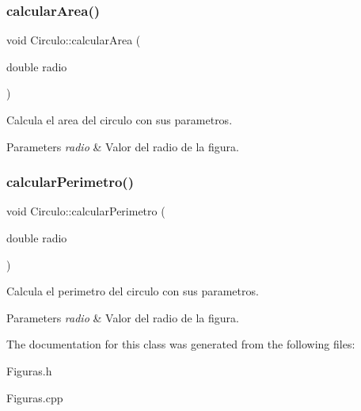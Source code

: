\subsubsection{\texorpdfstring{calcular\+Area()}{calcularArea()}}
{\ttfamily void Circulo\+::calcular\+Area (\begin{DoxyParamCaption}\item[{double}]{radio }\end{DoxyParamCaption})\hspace{0.3cm}{\ttfamily [virtual]}}



Calcula el area del circulo con sus parametros. 


\begin{DoxyParams}{Parameters}
{\em radio} & Valor del radio de la figura. \\
\hline
\end{DoxyParams}
\hypertarget{class_circulo_a4b621679f004d4a093cb18b676079a01}{}\label{class_circulo_a4b621679f004d4a093cb18b676079a01} 
\subsubsection{\texorpdfstring{calcular\+Perimetro()}{calcularPerimetro()}}
{\ttfamily void Circulo\+::calcular\+Perimetro (\begin{DoxyParamCaption}\item[{double}]{radio }\end{DoxyParamCaption})\hspace{0.3cm}{\ttfamily [virtual]}}



Calcula el perimetro del circulo con sus parametros. 


\begin{DoxyParams}{Parameters}
{\em radio} & Valor del radio de la figura. \\
\hline
\end{DoxyParams}


The documentation for this class was generated from the following files\+:\begin{DoxyCompactItemize}
\item 
Figuras.\+h\item 
Figuras.\+cpp\end{DoxyCompactItemize}
